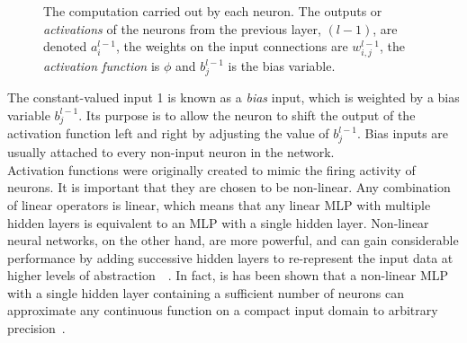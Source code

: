 \documentclass[a4paper, 12pt]{report}
\newcommand{\tit}[1]{\textit{#1}}
\begin{document}
\begin{figure}[h]
\captionsetup{justification=centering}
\begin{center}
\caption{The computation carried out by each neuron. The outputs or \tit{activations} of the neurons from the previous layer, $(l - 1)$, are denoted $a_i^{l-1}$, the weights on the input connections are $w_{i,j}^{l-1}$, the \tit{activation function} is $\phi$ and $b_j^{l - 1}$ is the bias variable.}
\label{fig:neuron}
\end{center}
\end{figure}

The constant-valued input 1 is known as a \tit{bias} input, which is weighted by a bias variable $b_j^{l - 1}$. Its purpose is to allow the neuron to shift the output of the activation function left and right by adjusting the value of $b_j^{l - 1}$. Bias inputs are usually attached to every non-input neuron in the network. \\

Activation functions were originally created to mimic the firing activity of neurons. It is important that they are chosen to be non-linear. Any combination of linear operators is linear, which means that any linear MLP with multiple hidden layers is equivalent to an MLP with a single hidden layer. Non-linear neural networks, on the other hand, are more powerful, and can gain considerable performance by adding successive hidden layers to re-represent the input data at higher levels of abstraction~\cite{dbn:hinton2006}~\cite{scaling:bengio2007}. In fact, is has been shown that a non-linear MLP with a single hidden layer containing a sufficient number of neurons can approximate any continuous function on a compact input domain to arbitrary precision~\cite{universal_approximators:hornik1989}. \\
\end{document}

